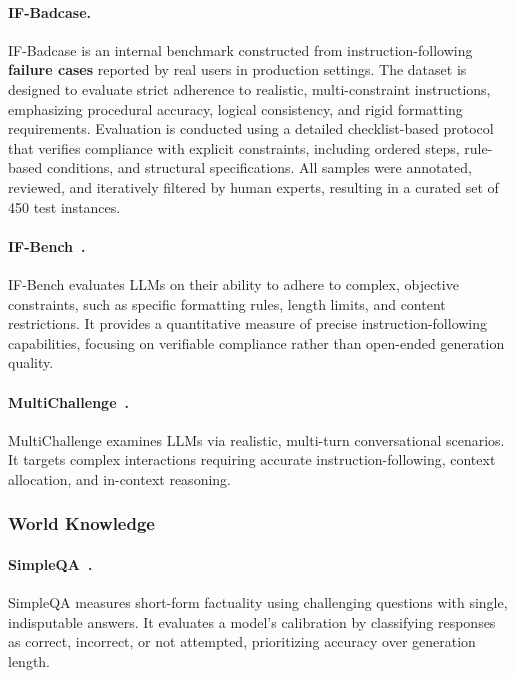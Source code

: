 \documentclass{article}
\theoremstyle{definition}
\begin{document}
\paragraph{IF-Badcase.} IF-Badcase is an internal benchmark constructed from instruction-following \textbf{failure cases} reported by real users in production settings. The dataset is designed to evaluate strict adherence to realistic, multi-constraint instructions, emphasizing procedural accuracy, logical consistency, and rigid formatting requirements.
Evaluation is conducted using a detailed checklist-based protocol that verifies compliance with explicit constraints, including ordered steps, rule-based conditions, and structural specifications. All samples were annotated, reviewed, and iteratively filtered by human experts, resulting in a curated set of 450 test instances.

\paragraph{IF-Bench~\citep{ifbench}.} IF-Bench evaluates LLMs on their ability to adhere to complex, objective constraints, such as specific formatting rules, length limits, and content restrictions. It provides a quantitative measure of precise instruction-following capabilities, focusing on verifiable compliance rather than open-ended generation quality.

\paragraph{MultiChallenge~\citep{multichallenge}.} MultiChallenge examines LLMs via realistic, multi-turn conversational scenarios. It targets complex interactions requiring accurate instruction-following, context allocation, and in-context reasoning.

\subsubsection{World Knowledge}

\paragraph{SimpleQA~\citep{simpleQA}.} SimpleQA measures short-form factuality using challenging questions with single, indisputable answers. It evaluates a model's calibration by classifying responses as correct, incorrect, or not attempted, prioritizing accuracy over generation length.
\end{document}
